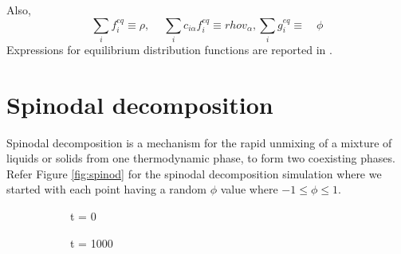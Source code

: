 \documentclass[a0,portrait]{a0poster}
\begin{document}
\begin{multicols}{3}
Also, 
\begin{equation}
\sum_{i} f_{i}^{eq} \equiv \rho, \quad \  \sum_{i} c_{i\alpha} f_{i}^{eq} \equiv rho v_{\alpha}, \sum_{i} g_{i}^{eq} \equiv \quad \phi 
\label{eq:fg}
\end{equation}
Expressions for equilibrium distribution functions are reported in \cite{paper:intertial_effects}.

\section{Spinodal decomposition}

Spinodal decomposition is a mechanism for the rapid unmixing of a mixture of liquids or solids from one thermodynamic phase, to form two coexisting phases. Refer Figure \ref*{fig:spinod} for the spinodal decomposition simulation where we started with each point having a random $\phi$ value where $ -1 \leq \phi \leq 1.  $
\begin{figure}[H]
	\centering
	\begin{subfigure}{4.2cm}            
		\caption{t = 0}
		\label{Fig:Data1}
	\end{subfigure}
	\begin{subfigure}{4.2cm}
		\centering
		\caption{t = 1000}
		\label{Fig:Data2}
	\end{subfigure}
	\begin{subfigure}{4.2cm}            

\end{subfigure}
\end{figure}
\end{multicols}
\end{document}
